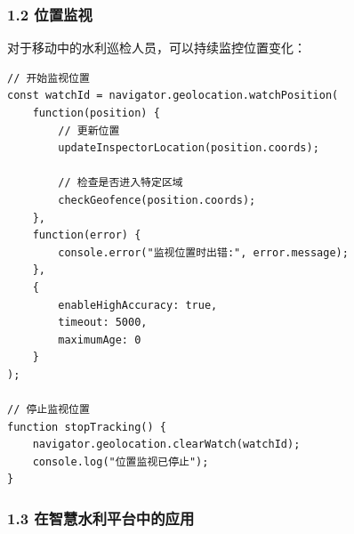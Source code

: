 \subsubsection{1.2 位置监视}\label{ux4f4dux7f6eux76d1ux89c6}

对于移动中的水利巡检人员，可以持续监控位置变化：

\begin{lstlisting}
// 开始监视位置
const watchId = navigator.geolocation.watchPosition(
    function(position) {
        // 更新位置
        updateInspectorLocation(position.coords);
        
        // 检查是否进入特定区域
        checkGeofence(position.coords);
    },
    function(error) {
        console.error("监视位置时出错:", error.message);
    },
    {
        enableHighAccuracy: true,
        timeout: 5000,
        maximumAge: 0
    }
);

// 停止监视位置
function stopTracking() {
    navigator.geolocation.clearWatch(watchId);
    console.log("位置监视已停止");
}
\end{lstlisting}

\subsubsection{1.3
在智慧水利平台中的应用}\label{ux5728ux667aux6167ux6c34ux5229ux5e73ux53f0ux4e2dux7684ux5e94ux7528}

